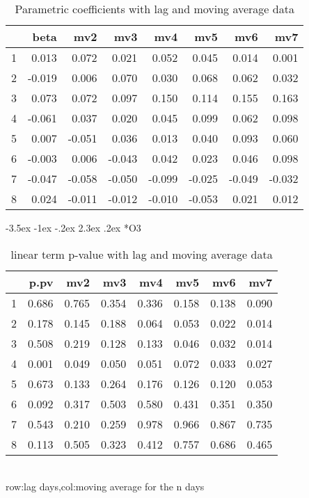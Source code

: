 \documentclass[a4paper, 12pt]{article}
\makeatletter
\def\large{\fontsize{14}{20}\selectfont}
\renewcommand\subsection{\@startsection {subsection}{1}{\z@}%
                                   {-3.5ex \@plus -1ex \@minus -.2ex}%
                                   {2.3ex \@plus.2ex}%
                                   {\centering\normalfont\large\bfseries}}
\makeatother
\begin{document}
\begin{table}[h]
\centering
\caption{Parametric coefficients with lag and moving average data}
\begin{tabular}{rrrrrrrr}
  \hline
 & beta & mv2 & mv3 & mv4 & mv5 & mv6 & mv7 \\
  \hline
1 & 0.013 & 0.072 & 0.021 & 0.052 & 0.045 & 0.014 & 0.001 \\
  2 & -0.019 & 0.006 & 0.070 & 0.030 & 0.068 & 0.062 & 0.032 \\
  3 & 0.073 & 0.072 & 0.097 & 0.150 & 0.114 & 0.155 & 0.163 \\
  4 & -0.061 & 0.037 & 0.020 & 0.045 & 0.099 & 0.062 & 0.098 \\
  5 & 0.007 & -0.051 & 0.036 & 0.013 & 0.040 & 0.093 & 0.060 \\
  6 & -0.003 & 0.006 & -0.043 & 0.042 & 0.023 & 0.046 & 0.098 \\
  7 & -0.047 & -0.058 & -0.050 & -0.099 & -0.025 & -0.049 & -0.032 \\
  8 & 0.024 & -0.011 & -0.012 & -0.010 & -0.053 & 0.021 & 0.012 \\
   \hline
\end{tabular}
\end{table}
\clearpage
\subsection*{O3}
\begin{table}[h]
\centering
\caption{linear term p-value with lag and moving average data}
\begin{tabular}{rrrrrrrr}
  \hline
 & p.pv & mv2 & mv3 & mv4 & mv5 & mv6 & mv7 \\
  \hline
1 & 0.686 & 0.765 & 0.354 & 0.336 & 0.158 & 0.138 & 0.090 \\
  2 & 0.178 & 0.145 & 0.188 & 0.064 & 0.053 & 0.022 & 0.014 \\
  3 & 0.508 & 0.219 & 0.128 & 0.133 & 0.046 & 0.032 & 0.014 \\
  4 & 0.001 & 0.049 & 0.050 & 0.051 & 0.072 & 0.033 & 0.027 \\
  5 & 0.673 & 0.133 & 0.264 & 0.176 & 0.126 & 0.120 & 0.053 \\
  6 & 0.092 & 0.317 & 0.503 & 0.580 & 0.431 & 0.351 & 0.350 \\
  7 & 0.543 & 0.210 & 0.259 & 0.978 & 0.966 & 0.867 & 0.735 \\
  8 & 0.113 & 0.505 & 0.323 & 0.412 & 0.757 & 0.686 & 0.465 \\
   \hline
\end{tabular}
\\row:lag days,col:moving average for the n days
\end{table}
\end{document}
